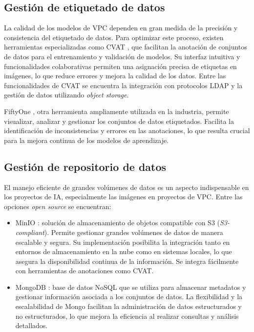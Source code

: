 \subsection{Gestión de etiquetado de datos}

La calidad de los modelos de VPC dependen en gran medida de la precisión y consistencia del etiquetado de datos. Para optimizar este proceso, existen herramientas especializadas como CVAT \citep{sekachev_opencvcvat_2020}, que facilitan la anotación de conjuntos de datos para el entrenamiento y validación de modelos. Su interfaz intuitiva y funcionalidades colaborativas permiten una asignación precisa de etiquetas en imágenes, lo que reduce errores y mejora la calidad de los datos. Entre las funcionalidades de CVAT se encuentra la integración con protocolos LDAP y la gestión de datos utilizando \textit{object storage}.

FiftyOne \citep{moore_fiftyone_2020}, otra herramienta ampliamente utilizada en la industria, permite visualizar, analizar y gestionar los conjuntos de datos etiquetados. Facilita la identificación de inconsistencias y errores en las anotaciones, lo que resulta crucial para la mejora continua de los modelos de aprendizaje.

\subsection{Gestión de repositorio de datos}
\label{sec:gestionRepoDatos}

El manejo eficiente de grandes volúmenes de datos es un aspecto indispensable en los proyectos de IA, especialmente las imágenes en proyectos de VPC. Entre las opciones \textit{open source} se encuentran:

\begin{itemize}
	\item MinIO \citep{minio_inc_minio_2023}: solución de almacenamiento de objetos compatible con S3 \citep{amazon_amazon_2024} (\textit{S3-compliant}). Permite gestionar grandes volúmenes de datos de manera escalable y segura. Su implementación posibilita la integración tanto en entornos de almacenamiento en la nube como en sistemas locales, lo que asegura la disponibilidad continua de la información. Se integra fácilmente con herramientas de anotaciones como CVAT.
	\item MongoDB \citep{mongodb_inc_mongodb_2023}: base de datos NoSQL que se utiliza para almacenar metadatos y gestionar información asociada a los conjuntos de datos. La flexibilidad y la escalabilidad de Mongo facilitan la administración de datos estructurados y no estructurados, lo que mejora la eficiencia al realizar consultas y análisis detallados.
\end{itemize}

